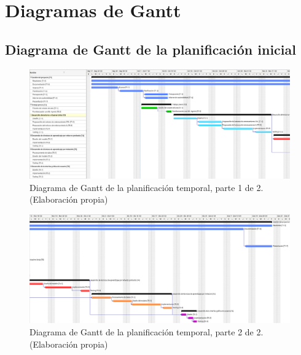 \clearpage
\appendix

\begingroup
\makeatletter
\let\ps@plain\ps@empty
\appendixpage
\makeatother
\endgroup


\chapter{Diagramas de Gantt}
\section{Diagrama de Gantt de la planificación inicial} \label{appendix:a}
\begin{figure}[H]
\centering
\includegraphics[width=\textwidth]{figures/gantter1.png}
\caption[Diagrama de Gantt de la planificación inicial, parte 1 de 2]{Diagrama de Gantt de la planificación temporal, parte 1 de 2. (Elaboración propia)}
\label{fig:gantter1}
\end{figure}

\begin{figure}[H]
\centering
\includegraphics[width=\textwidth]{figures/gantter2.png}
\caption[Diagrama de Gantt de la planificación inicial, parte 2 de 2]{Diagrama de Gantt de la planificación temporal, parte 2 de 2. (Elaboración propia)}
\label{fig:gantter2}
\end{figure}

\newpage

